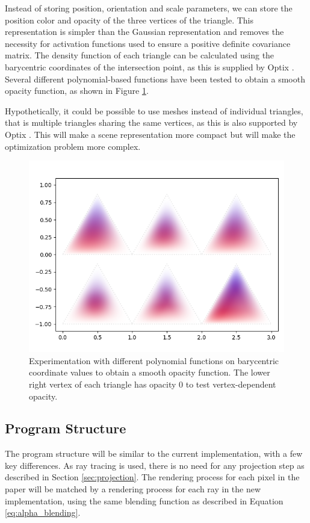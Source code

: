 Instead of storing position, orientation and scale parameters, we can store the position color and opacity of the three vertices of the triangle.
This representation is simpler than the Gaussian representation and removes the necessity for activation functions used to ensure a positive definite covariance matrix.
The density function of each triangle can be calculated using the barycentric coordinates of the intersection point, as this is supplied by Optix \cite{nvidiaNVIDIAOptiXProgramming2023}.
Several different polynomial-based functions have been tested to obtain a smooth opacity function, as shown in Figure \ref{fig:alphas}.

Hypothetically, it could be possible to use meshes instead of individual triangles, that is multiple triangles sharing the same vertices, as this is also supported by Optix \cite{nvidiaNVIDIAOptiXProgramming2023}.
This will make a scene representation more compact but will make the optimization problem more complex.


\begin{figure}
    \centering
    \includegraphics[width=\linewidth]{images/alphas.png}
    \caption{Experimentation with different polynomial functions on barycentric coordinate values to obtain a smooth opacity function. The lower right vertex of each triangle has opacity 0 to test vertex-dependent opacity.}
    \label{fig:alphas}
\end{figure}

\subsection{Program Structure}
The program structure will be similar to the current implementation, with a few key differences.
As ray tracing is used, there is no need for any projection step as described in Section \ref{sec:projection}.
The rendering process for each pixel in the paper will be matched by a rendering process for each ray in the new implementation, using the same blending function as described in Equation \ref{eq:alpha_blending}.

